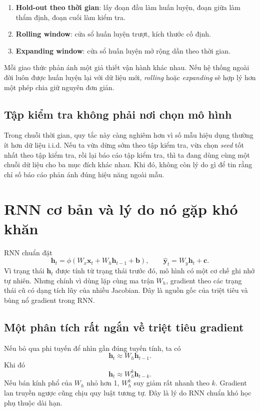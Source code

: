 \begin{enumerate}
\item \textbf{Hold-out theo thời gian}: lấy đoạn đầu làm huấn luyện, đoạn giữa làm thẩm định, đoạn cuối làm kiểm tra.
\item \textbf{Rolling window}: cửa sổ huấn luyện trượt, kích thước cố định.
\item \textbf{Expanding window}: cửa sổ huấn luyện mở rộng dần theo thời gian.
\end{enumerate}

Mỗi giao thức phản ánh một giả thiết vận hành khác nhau. Nếu hệ thống ngoài đời luôn được huấn luyện lại với dữ liệu mới, \emph{rolling} hoặc \emph{expanding} sẽ hợp lý hơn một phép chia giữ nguyên đơn giản.

\subsection{Tập kiểm tra không phải nơi chọn mô hình}

Trong chuỗi thời gian, quy tắc này càng nghiêm hơn vì số mẫu hiệu dụng thường ít hơn dữ liệu i.i.d. Nếu ta vừa dừng sớm theo tập kiểm tra, vừa chọn \emph{seed} tốt nhất theo tập kiểm tra, rồi lại báo cáo tập kiểm tra, thì ta đang dùng cùng một chuỗi dữ liệu cho ba mục đích khác nhau. Khi đó, không còn lý do gì để tin rằng chỉ số báo cáo phản ánh đúng hiệu năng ngoài mẫu.

\section{RNN cơ bản và lý do nó gặp khó khăn}

RNN chuẩn đặt
\[
\bm{h}_t=\phi(W_x\bm{x}_t+W_h\bm{h}_{t-1}+\bm{b}),
\qquad
\hat{\bm{y}}_t=W_y\bm{h}_t+\bm{c}.
\]
Vì trạng thái \(\bm{h}_t\) được tính từ trạng thái trước đó, mô hình có một cơ chế ghi nhớ tự nhiên. Nhưng chính vì dùng lặp cùng ma trận \(W_h\), gradient theo các trạng thái cũ có dạng tích lũy của nhiều Jacobian. Đây là nguồn gốc của triệt tiêu và bùng nổ gradient trong RNN.

\subsection{Một phân tích rất ngắn về triệt tiêu gradient}

Nếu bỏ qua phi tuyến để nhìn gần đúng tuyến tính, ta có
\[
\bm{h}_t\approx W_h\bm{h}_{t-1}.
\]
Khi đó
\[
\bm{h}_t\approx W_h^k \bm{h}_{t-k}.
\]
Nếu bán kính phổ của \(W_h\) nhỏ hơn 1, \(W_h^k\) suy giảm rất nhanh theo \(k\). Gradient lan truyền ngược cũng chịu quy luật tương tự. Đây là lý do RNN chuẩn khó học phụ thuộc dài hạn.

